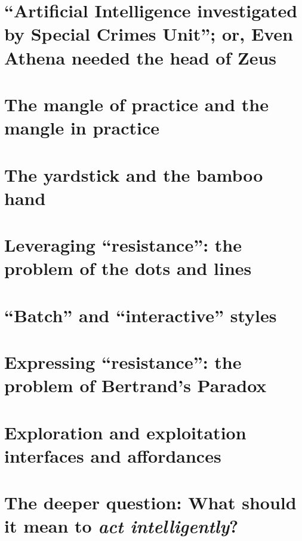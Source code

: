 \section{``Artificial Intelligence investigated by Special Crimes Unit''; or, Even Athena needed the head of Zeus}\hypertarget{artificial-intelligence-investigated-by-special-crimes-unit-or-even-athena-needed-the-head-of-zeus}{}\label{artificial-intelligence-investigated-by-special-crimes-unit-or-even-athena-needed-the-head-of-zeus}

\section{The mangle of practice and the mangle in practice}\hypertarget{the-mangle-of-practice-and-the-mangle-in-practice}{}\label{the-mangle-of-practice-and-the-mangle-in-practice}

\section{The yardstick and the bamboo hand}\hypertarget{the-yardstick-and-the-bamboo-hand}{}\label{the-yardstick-and-the-bamboo-hand}

\section{Leveraging ``resistance'': the problem of the dots and lines}\hypertarget{leveraging-resistance-the-problem-of-the-dots-and-lines}{}\label{leveraging-resistance-the-problem-of-the-dots-and-lines}

\section{``Batch'' and ``interactive'' styles}\hypertarget{batch-and-interactive-styles}{}\label{batch-and-interactive-styles}

\section{Expressing ``resistance'': the problem of Bertrand's Paradox}\hypertarget{expressing-resistance-the-problem-of-bertrands-paradox}{}\label{expressing-resistance-the-problem-of-bertrands-paradox}

\section{Exploration and exploitation interfaces and affordances}\hypertarget{exploration-and-exploitation-interfaces-and-affordances}{}\label{exploration-and-exploitation-interfaces-and-affordances}

\section{The deeper question: What should it mean to \emph{act intelligently}?}\hypertarget{the-deeper-question-what-should-it-mean-to-act-intelligently}{}\label{the-deeper-question-what-should-it-mean-to-act-intelligently}

